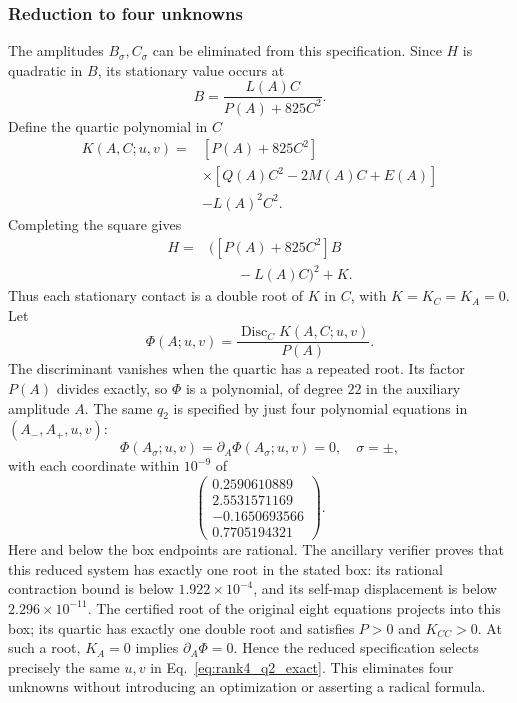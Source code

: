 \documentclass[11pt]{article}
\begin{document}
\subsubsection{Reduction to four unknowns}
The amplitudes $B_\sigma,C_\sigma$ can be eliminated from this specification. Since $H$ is quadratic in $B$, its stationary value occurs at
\begin{equation}
 B=\frac{L(A)C}{P(A)+825C^2}.
\end{equation}
Define the quartic polynomial in $C$
\begin{align}\label{eq:roof_q2_quartic}
 K(A,C;u,v)={}&[P(A)+825C^2]\nonumber\\
 &\times[Q(A)C^2-2M(A)C+E(A)]\nonumber\\
 &-L(A)^2C^2.
\end{align}
Completing the square gives
\begin{align}
 [P(A)+825C^2]H={}&\bigl([P(A)+825C^2]B\nonumber\\
 &\qquad-L(A)C\bigr)^2+K.
\end{align}
Thus each stationary contact is a double root of $K$ in $C$, with $K=K_C=K_A=0$. Let
\begin{equation}\label{eq:roof_q2_discriminant}
 \Phi(A;u,v)=\frac{\operatorname{Disc}_C K(A,C;u,v)}{P(A)}.
\end{equation}
The discriminant vanishes when the quartic has a repeated root. Its factor $P(A)$ divides exactly, so $\Phi$ is a polynomial, of degree $22$ in the auxiliary amplitude $A$. The same $q_2$ is specified by just four polynomial equations in $(A_-,A_+,u,v)$:
\begin{equation}\label{eq:roof_q2_reduced_system}
 \Phi(A_\sigma;u,v)=\partial_A\Phi(A_\sigma;u,v)=0,
 \quad\sigma=\pm,
\end{equation}
with each coordinate within $10^{-9}$ of
\begin{equation}\label{eq:roof_q2_reduced_box}
 \begin{pmatrix}
 0.2590610889\\2.5531571169\\
 -0.1650693566\\0.7705194321
 \end{pmatrix}.
\end{equation}
Here and below the box endpoints are rational. The ancillary verifier proves that this reduced system has exactly one root in the stated box: its rational contraction bound is below $1.922\times10^{-4}$, and its self-map displacement is below $2.296\times10^{-11}$. The certified root of the original eight equations projects into this box; its quartic has exactly one double root and satisfies $P>0$ and $K_{CC}>0$. At such a root, $K_A=0$ implies $\partial_A\Phi=0$. Hence the reduced specification selects precisely the same $u,v$ in Eq.~\eqref{eq:rank4_q2_exact}. This eliminates four unknowns without introducing an optimization or asserting a radical formula.
\end{document}
